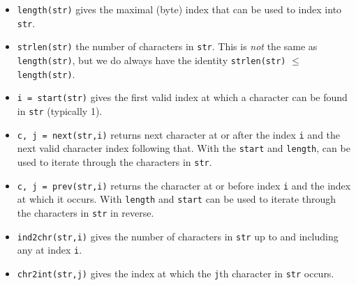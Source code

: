 \documentclass{article}
\begin{document}
\begin{itemize}
\item \verb|length(str)| gives the maximal (byte) index that can be used to index into \verb|str|.

\item \verb|strlen(str)| the number of characters in \verb|str|.
This is \emph{not} the same as \verb|length(str)|, but we do always have the identity \verb|strlen(str)| $\le$ \verb|length(str)|.

\item \verb|i = start(str)| gives the first valid index at which a character can be found in \verb|str| (typically 1).

\item \verb|c, j = next(str,i)| returns next character at or after the index \verb|i| and the next valid character index following that.
With the \verb|start| and \verb|length|, can be used to iterate through the characters in \verb|str|.


\item \verb|c, j = prev(str,i)| returns the character at or before index \verb|i| and the index at which it occurs.
With \verb|length| and \verb|start| can be used to iterate through the characters in \verb|str| in reverse.

\item \verb|ind2chr(str,i)| gives the number of characters in \verb|str| up to and including any at index \verb|i|.

\item \verb|chr2int(str,j)| gives the index at which the \verb|j|th character in \verb|str| occurs.
\end{itemize}
\end{document}
